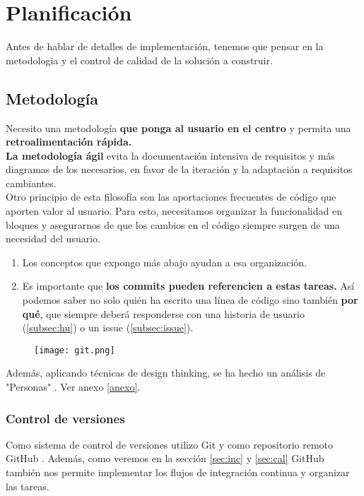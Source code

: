 \chapter{Planificación}

Antes de hablar de detalles de implementación, tenemos que pensar en la metodologia y el control de calidad de la solución a construir.

\section{Metodología}

Necesito una metodología \textbf{que ponga al usuario en el centro} y permita una \textbf{retroalimentación rápida.} \\
\textbf{La metodología ágil} evita la documentación intensiva de requisitos y más diagramas de los necesarios, en favor de la iteración y la adaptación a requisitos cambiantes.\\

Otro principio de esta filosofía son las aportaciones frecuentes de código que aporten valor al usuario. Para esto, 
necesitamos organizar la funcionalidad en bloques y asegurarnos de que los cambios en el código siempre surgen
de una necesidad del usuario.
\begin{enumerate}
	\item Los conceptos que expongo más abajo ayudan a esa organización.
	\item Es importante que \textbf{los commits pueden referencien a estas tareas.} Así podemos
saber no solo quién ha escrito una línea de código sino también \textbf{por qué}, que siempre deberá responderse con una historia de usuario (\ref{subsec:hu}) o un issue (\ref{subsec:issue}).
\end{enumerate}

\begin{figure}[H]
\centering	
\texttt{[image: git.png]}
\end{figure}

Además, aplicando técnicas de design thinking, se ha hecho un análisis de "Personas" \cite{personas}. Ver anexo \ref{anexo}.

\subsection{Control de versiones}
Como sistema de control de versiones utilizo Git y como repositorio remoto GitHub \cite{repo}. Además, como veremos en la sección \ref{sec:inc} y \ref{sec:cal} GitHub
también nos permite implementar los flujos de integración continua y organizar las tareas.

